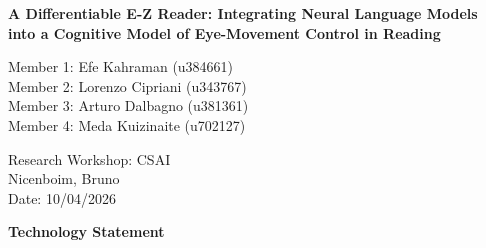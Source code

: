\documentclass[12pt]{article}
\begin{document}
\begin{titlepage}
  \thispagestyle{empty}
  \begin{center}
    \vspace*{2in}
    \textbf{A Differentiable E-Z Reader: Integrating Neural Language Models\\
    into a Cognitive Model of Eye-Movement Control in Reading}

    \vspace{24pt}
    Member 1: Efe Kahraman (u384661)\\[6pt]
    Member 2: Lorenzo Cipriani (u343767) \\[6pt]
    Member 3: Arturo Dalbagno (u381361) \\[6pt]
    Member 4: Meda Kuizinaite (u702127)

    \vspace{24pt}
    {Research Workshop: CSAI}\\[4pt]
    {Nicenboim, Bruno}\\[4pt]
    {Date: 10/04/2026}
  \end{center}
\end{titlepage}

\newpage
\thispagestyle{empty}
\begin{center}
  {\large\textbf{Technology Statement}}
\end{center}
\vspace{12pt}
\end{document}
